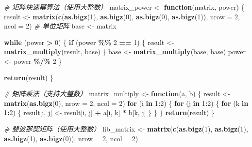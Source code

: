 \documentclass[
]{book}
\newenvironment{Shaded}{\begin{snugshade}}{\end{snugshade}}
\newcommand{\AttributeTok}[1]{\textcolor[rgb]{0.13,0.29,0.53}{#1}}
\newcommand{\CommentTok}[1]{\textcolor[rgb]{0.56,0.35,0.01}{\textit{#1}}}
\newcommand{\ControlFlowTok}[1]{\textcolor[rgb]{0.13,0.29,0.53}{\textbf{#1}}}
\newcommand{\DecValTok}[1]{\textcolor[rgb]{0.00,0.00,0.81}{#1}}
\newcommand{\FunctionTok}[1]{\textcolor[rgb]{0.13,0.29,0.53}{\textbf{#1}}}
\newcommand{\NormalTok}[1]{#1}
\newcommand{\OtherTok}[1]{\textcolor[rgb]{0.56,0.35,0.01}{#1}}
\newcommand{\SpecialCharTok}[1]{\textcolor[rgb]{0.81,0.36,0.00}{\textbf{#1}}}
\begin{document}
\begin{itemize}
\begin{Shaded}
\begin{Highlighting}[]
  \CommentTok{\# 矩阵快速幂算法（使用大整数）}
\NormalTok{  matrix\_power }\OtherTok{\textless{}{-}} \ControlFlowTok{function}\NormalTok{(matrix, power) \{}
\NormalTok{    result }\OtherTok{\textless{}{-}} \FunctionTok{matrix}\NormalTok{(}\FunctionTok{c}\NormalTok{(}\FunctionTok{as.bigz}\NormalTok{(}\DecValTok{1}\NormalTok{), }\FunctionTok{as.bigz}\NormalTok{(}\DecValTok{0}\NormalTok{), }\FunctionTok{as.bigz}\NormalTok{(}\DecValTok{0}\NormalTok{), }\FunctionTok{as.bigz}\NormalTok{(}\DecValTok{1}\NormalTok{)),}
                    \AttributeTok{nrow =} \DecValTok{2}\NormalTok{, }\AttributeTok{ncol =} \DecValTok{2}\NormalTok{)  }\CommentTok{\# 单位矩阵}
\NormalTok{    base }\OtherTok{\textless{}{-}}\NormalTok{ matrix}

    \ControlFlowTok{while}\NormalTok{ (power }\SpecialCharTok{\textgreater{}} \DecValTok{0}\NormalTok{) \{}
      \ControlFlowTok{if}\NormalTok{ (power }\SpecialCharTok{\%\%} \DecValTok{2} \SpecialCharTok{==} \DecValTok{1}\NormalTok{) \{}
\NormalTok{        result }\OtherTok{\textless{}{-}} \FunctionTok{matrix\_multiply}\NormalTok{(result, base)}
\NormalTok{      \}}
\NormalTok{      base }\OtherTok{\textless{}{-}} \FunctionTok{matrix\_multiply}\NormalTok{(base, base)}
\NormalTok{      power }\OtherTok{\textless{}{-}}\NormalTok{ power }\SpecialCharTok{\%/\%} \DecValTok{2}
\NormalTok{    \}}

    \FunctionTok{return}\NormalTok{(result)}
\NormalTok{  \}}

  \CommentTok{\# 矩阵乘法（支持大整数）}
\NormalTok{  matrix\_multiply }\OtherTok{\textless{}{-}} \ControlFlowTok{function}\NormalTok{(a, b) \{}
\NormalTok{    result }\OtherTok{\textless{}{-}} \FunctionTok{matrix}\NormalTok{(}\FunctionTok{as.bigz}\NormalTok{(}\DecValTok{0}\NormalTok{), }\AttributeTok{nrow =} \DecValTok{2}\NormalTok{, }\AttributeTok{ncol =} \DecValTok{2}\NormalTok{)}
    \ControlFlowTok{for}\NormalTok{ (i }\ControlFlowTok{in} \DecValTok{1}\SpecialCharTok{:}\DecValTok{2}\NormalTok{) \{}
      \ControlFlowTok{for}\NormalTok{ (j }\ControlFlowTok{in} \DecValTok{1}\SpecialCharTok{:}\DecValTok{2}\NormalTok{) \{}
        \ControlFlowTok{for}\NormalTok{ (k }\ControlFlowTok{in} \DecValTok{1}\SpecialCharTok{:}\DecValTok{2}\NormalTok{) \{}
\NormalTok{          result[i, j] }\OtherTok{\textless{}{-}}\NormalTok{ result[i, j] }\SpecialCharTok{+}\NormalTok{ a[i, k] }\SpecialCharTok{*}\NormalTok{ b[k, j]}
\NormalTok{        \}}
\NormalTok{      \}}
\NormalTok{    \}}
    \FunctionTok{return}\NormalTok{(result)}
\NormalTok{  \}}

  \CommentTok{\# 斐波那契矩阵（使用大整数）}
\NormalTok{  fib\_matrix }\OtherTok{\textless{}{-}} \FunctionTok{matrix}\NormalTok{(}\FunctionTok{c}\NormalTok{(}\FunctionTok{as.bigz}\NormalTok{(}\DecValTok{1}\NormalTok{), }\FunctionTok{as.bigz}\NormalTok{(}\DecValTok{1}\NormalTok{), }\FunctionTok{as.bigz}\NormalTok{(}\DecValTok{1}\NormalTok{), }\FunctionTok{as.bigz}\NormalTok{(}\DecValTok{0}\NormalTok{)),}
                      \AttributeTok{nrow =} \DecValTok{2}\NormalTok{, }\AttributeTok{ncol =} \DecValTok{2}\NormalTok{)}


\end{Highlighting}
\end{Shaded}
\end{itemize}
\end{document}
